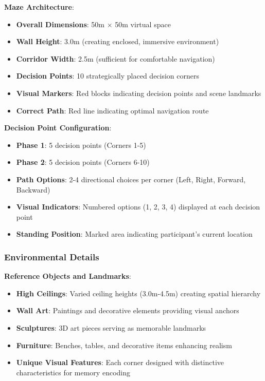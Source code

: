 \documentclass[12pt]{article}
\begin{document}
\textbf{Maze Architecture}:
\begin{itemize}
    \item \textbf{Overall Dimensions}: 50m $\times$ 50m virtual space
    \item \textbf{Wall Height}: 3.0m (creating enclosed, immersive environment)
    \item \textbf{Corridor Width}: 2.5m (sufficient for comfortable navigation)
    \item \textbf{Decision Points}: 10 strategically placed decision corners
    \item \textbf{Visual Markers}: Red blocks indicating decision points and scene landmarks
    \item \textbf{Correct Path}: Red line indicating optimal navigation route
\end{itemize}

\textbf{Decision Point Configuration}:
\begin{itemize}
    \item \textbf{Phase 1}: 5 decision points (Corners 1-5)
    \item \textbf{Phase 2}: 5 decision points (Corners 6-10)
    \item \textbf{Path Options}: 2-4 directional choices per corner (Left, Right, Forward, Backward)
    \item \textbf{Visual Indicators}: Numbered options (1, 2, 3, 4) displayed at each decision point
    \item \textbf{Standing Position}: Marked area indicating participant's current location
\end{itemize}

\subsubsection{Environmental Details}

\textbf{Reference Objects and Landmarks}:
\begin{itemize}
    \item \textbf{High Ceilings}: Varied ceiling heights (3.0m-4.5m) creating spatial hierarchy
    \item \textbf{Wall Art}: Paintings and decorative elements providing visual anchors
    \item \textbf{Sculptures}: 3D art pieces serving as memorable landmarks
    \item \textbf{Furniture}: Benches, tables, and decorative items enhancing realism
    \item \textbf{Unique Visual Features}: Each corner designed with distinctive characteristics for memory encoding
\end{itemize}
\end{document}
